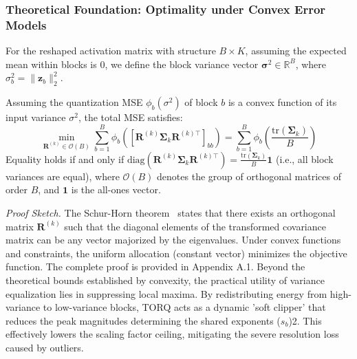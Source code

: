 \subsubsection{Theoretical Foundation: Optimality under Convex Error Models}

For the reshaped activation matrix with structure $B \times K$, assuming the expected mean within blocks is 0, we define the block variance vector $\boldsymbol{\sigma}^2 \in \mathbb{R}^B$, where $\sigma_b^2 = \|\mathbf{z}_b\|_2^2$.

\begin{theorem}
\label{thm:optimality}
Assuming the quantization MSE $\phi_b(\sigma^2)$ of block $b$ is a convex function of its input variance $\sigma^2$, the total MSE satisfies:
\begin{equation}
\min_{\mathbf{R}^{(k)} \in \mathcal{O}(B)} \sum_{b=1}^B \phi_b\left([\mathbf{R}^{(k)}\boldsymbol{\Sigma}_k\mathbf{R}^{(k)\top}]_{bb}\right) = \sum_{b=1}^B \phi_b\left(\frac{\mathrm{tr}(\boldsymbol{\Sigma}_k)}{B}\right)
\end{equation}
Equality holds if and only if $\mathrm{diag}(\mathbf{R}^{(k)}\boldsymbol{\Sigma}_k\mathbf{R}^{(k)\top}) = \frac{\mathrm{tr}(\boldsymbol{\Sigma}_k)}{B}\mathbf{1}$ (i.e., all block variances are equal), where $\mathcal{O}(B)$ denotes the group of orthogonal matrices of order $B$, and $\mathbf{1}$ is the all-ones vector.
\end{theorem}

\textit{Proof Sketch.} The Schur-Horn theorem~\cite{schur_horn} states that there exists an orthogonal matrix $\mathbf{R}^{(k)}$ such that the diagonal elements of the transformed covariance matrix can be any vector majorized by the eigenvalues. Under convex functions and constraints, the uniform allocation (constant vector) minimizes the objective function. The complete proof is provided in Appendix A.1.
Beyond the theoretical bounds established by convexity, the practical utility of variance equalization lies in suppressing local maxima. By redistributing energy from high-variance to low-variance blocks, TORQ acts as a dynamic 'soft clipper' that reduces the peak magnitudes determining the shared exponents ($s_b$)2. This effectively lowers the scaling factor ceiling, mitigating the severe resolution loss caused by outliers.

